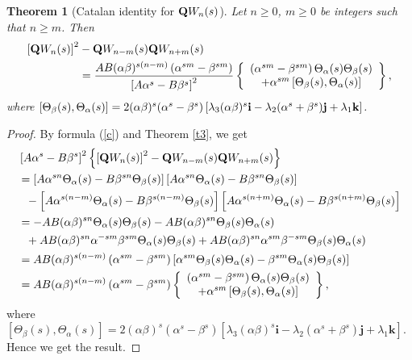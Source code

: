 \documentclass{kms-c}
\theoremstyle{plain}
\newtheorem{theorem}{Theorem}[section]
\theoremstyle{definition}
\theoremstyle{remark}
\begin{document}
\begin{theorem}[Catalan identity for $\textnormal{\textbf{Q}}W_{n}(s)$]\label{t5}
Let $n\geq 0$, $m\geq 0$ be integers such that $n\geq m$. Then
\begin{align*}
\left[\textnormal{\textbf{Q}}W_{n}(s)\right]^{2}&-\textnormal{\textbf{Q}}W_{n-m}(s)\textnormal{\textbf{Q}}W_{n+m}(s)\\
&=\frac{AB(\alpha\beta)^{s(n-m)}\left(\alpha^{sm}-\beta^{sm}\right)}{\left[A\alpha^{s}-B\beta^{s}\right]^{2}}\left\lbrace \begin{array}{c} 
\left(\alpha^{sm}-\beta^{sm}\right)\Theta_{\alpha}(s)\Theta_{\beta}(s)\\
+ \alpha^{sm}\left[\Theta_{\beta}(s),\Theta_{\alpha}(s)\right]
\end{array}\right\rbrace ,
\end{align*}
where $\left[\Theta_{\beta}(s),\Theta_{\alpha}(s)\right]=2(\alpha\beta)^{s}(\alpha^{s}-\beta^{s})\left[\lambda_{3}(\alpha\beta)^{s}\textnormal{\textbf{i}}-\lambda_{2}(\alpha^{s}+\beta^{s})\textnormal{\textbf{j}}+\lambda_{1}\textnormal{\textbf{k}}\right]$.
\end{theorem}
\begin{proof}
By formula (\ref{c}) and Theorem \ref{t3}, we get
\begin{align*}
&\left[A\alpha^{s}-B\beta^{s}\right]^{2}\left\lbrace \left[\textnormal{\textbf{Q}}W_{n}(s)\right]^{2}-\textnormal{\textbf{Q}}W_{n-m}(s)\textnormal{\textbf{Q}}W_{n+m}(s)\right\rbrace \\
&=\left[A\alpha^{sn}\Theta_{\alpha}(s)-B\beta^{sn}\Theta_{\beta}(s)\right]\left[A\alpha^{sn}\Theta_{\alpha}(s)-B\beta^{sn}\Theta_{\beta}(s)\right]\\
&\ \ - \left[A\alpha^{s(n-m)}\Theta_{\alpha}(s)-B\beta^{s(n-m)}\Theta_{\beta}(s)\right]\left[A\alpha^{s(n+m)}\Theta_{\alpha}(s)-B\beta^{s(n+m)}\Theta_{\beta}(s)\right]\\
&=-AB(\alpha\beta)^{sn}\Theta_{\alpha}(s)\Theta_{\beta}(s)-AB(\alpha\beta)^{sn}\Theta_{\beta}(s)\Theta_{\alpha}(s)\\
&\ \ + AB(\alpha\beta)^{sn}\alpha^{-sm}\beta^{sm}\Theta_{\alpha}(s)\Theta_{\beta}(s)+AB(\alpha\beta)^{sn}\alpha^{sm}\beta^{-sm}\Theta_{\beta}(s)\Theta_{\alpha}(s)\\
&=AB(\alpha\beta)^{s(n-m)}\left(\alpha^{sm}-\beta^{sm}\right)\left[\alpha^{sm}\Theta_{\beta}(s)\Theta_{\alpha}(s)-\beta^{sm}\Theta_{\alpha}(s)\Theta_{\beta}(s)\right]\\
&=AB(\alpha\beta)^{s(n-m)}\left(\alpha^{sm}-\beta^{sm}\right)\left\lbrace \begin{array}{c} 
\left(\alpha^{sm}-\beta^{sm}\right)\Theta_{\alpha}(s)\Theta_{\beta}(s)\\
+ \alpha^{sm}\left[\Theta_{\beta}(s),\Theta_{\alpha}(s)\right]
\end{array}\right\rbrace ,
\end{align*}
where $\left[\Theta_{\beta}(s),\Theta_{\alpha}(s)\right]=2(\alpha\beta)^{s}(\alpha^{s}-\beta^{s})\left[\lambda_{3}(\alpha\beta)^{s}\textbf{i}-\lambda_{2}(\alpha^{s}+\beta^{s})\textbf{j}+\lambda_{1}\textbf{k}\right]$. Hence we get the result.
\end{proof}
\end{document}
